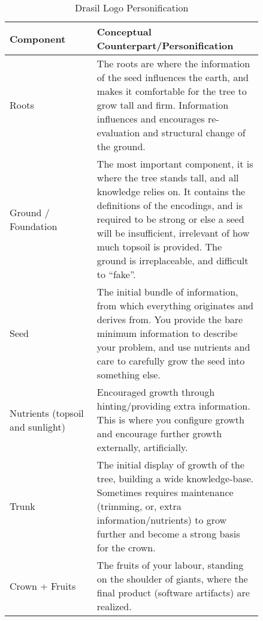 \begin{longtable}[c]{|>{\raggedright}p{0.3\linewidth}|>{\raggedright\arraybackslash}p{0.54\linewidth}|}
    \caption{Drasil Logo Personification}
    \label{tab:drasilPersonification}
    \\

    \hline

    \rowcolor{McMasterMediumGrey}
    \textbf{Component}                 & \textbf{Conceptual Counterpart/Personification}

    \\ \hline

    {Roots}                            & {The roots are where the information of
            the seed influences the earth, and makes it comfortable for the tree
            to grow tall and firm. Information influences and encourages
            re-evaluation and structural change of the ground.}

    \\ \hline

    {Ground / Foundation}              & {The most important component, it is
            where the tree stands tall, and all knowledge relies on. It contains
            the definitions of the encodings, and is required to be strong or
            else a seed will be insufficient, irrelevant of how much topsoil is
            provided. The ground is irreplaceable, and difficult to ``fake''.}

    \\ \hline

    {Seed}                             & {The initial bundle of information,
            from which everything originates and derives from. You provide the
            bare minimum information to describe your problem, and use nutrients
            and care to carefully grow the seed into something else.}

    \\ \hline

    {Nutrients (topsoil and sunlight)} & {Encouraged growth through
            hinting/providing extra information. This is where you configure
            growth and encourage further growth externally, artificially.}

    \\ \hline

    {Trunk}                            & {The initial display of growth of the
            tree, building a wide knowledge-base. Sometimes requires maintenance
            (trimming, or, extra information/nutrients) to grow further and
            become a strong basis for the crown.}

    \\ \hline

    {Crown + Fruits}                   & {The fruits of your labour, standing on
            the shoulder of giants, where the final product (software artifacts)
            are realized.}

    \\ \hline
\end{longtable}
